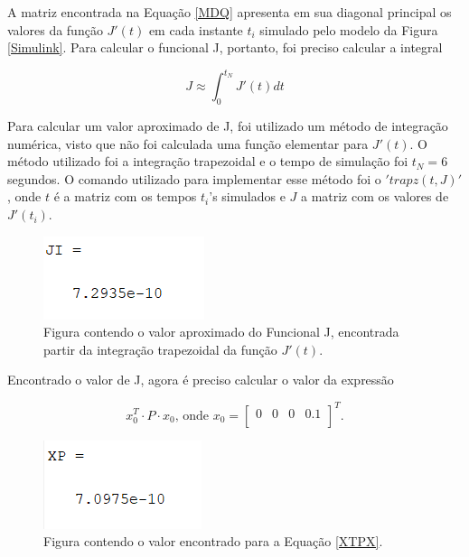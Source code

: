 \documentclass[a4paper,12pt]{article}
\begin{document}
\normalsize

A matriz encontrada na Equação \ref{MDQ} apresenta em sua diagonal principal os valores da função $J'(t)$ em cada instante $t_i$ simulado pelo modelo da Figura \ref{Simulink}. Para calcular o funcional J, portanto, foi preciso calcular a integral

$$ J \approx \int_{0}^{t_N}J'(t)dt $$

Para calcular um valor aproximado de J, foi utilizado um método de integração numérica, visto que não foi calculada uma função elementar para $J'(t)$. O método utilizado foi a integração trapezoidal e o tempo de simulação foi $t_N = 6$ segundos. O comando utilizado para implementar esse método foi o $'trapz(t,J)'$, onde $t$ é a matriz com os tempos $t_i$'s simulados e $J$ a matriz com os valores de $J'(t_i)$.

\begin{figure}[!h]
  \hspace*{-1cm} 
  \includegraphics[width=4 cm]{FuncionalJ.png}
  \centering
  \caption{Figura contendo o valor aproximado do Funcional J, encontrada partir da integração trapezoidal da função $J'(t)$.}
  \label{FuncionalJ}
\end{figure}

Encontrado o valor de J, agora é preciso calcular o valor da expressão 

\begin{equation}
 x_{0}^{T}\cdot P\cdot x_{0} \text{, onde } x_{0} = [\begin{array}{cccc}
   0  &  0 & 0 & 0.1\\
\end{array}]^T.\label{XTPX}\end{equation}

\begin{figure}[!h]
  \hspace*{-1cm} 
  \includegraphics[width=4 cm]{X0TPX0.png}
  \centering
  \caption{Figura contendo o valor encontrado para a Equação \ref{XTPX}. }
  \label{XPX}
\end{figure}
\end{document}
